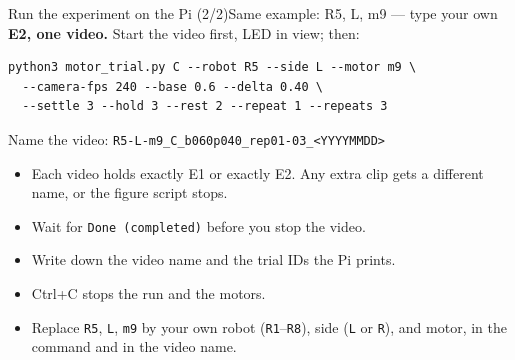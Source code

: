 %
\begin{frame}[fragile]{Run the experiment on the Pi (2/2)}{Same example: R5, L, m9 --- type your own}
  \label{app:pi-e2}
  \scriptsize
  \textbf{E2, one video.} Start the video first, LED in view; then:
\begin{verbatim}
python3 motor_trial.py C --robot R5 --side L --motor m9 \
  --camera-fps 240 --base 0.6 --delta 0.40 \
  --settle 3 --hold 3 --rest 2 --repeat 1 --repeats 3
\end{verbatim}
  \vspace{-4pt}
  Name the video: \texttt{R5-L-m9\_C\_b060p040\_rep01-03\_<YYYYMMDD>}

  \vspace{6pt}
  \begin{itemize}\setlength{\itemsep}{3pt}
    \item Each video holds \alert{exactly E1 or exactly E2}. Any extra clip gets a different name, or the figure script stops.
    \item Wait for \texttt{Done (completed)} before you stop the video.
    \item Write down the video name and the trial IDs the Pi prints.
    \item \alert{Ctrl+C} stops the run and the motors.
    \item Replace \texttt{R5}, \texttt{L}, \texttt{m9} by your own robot (\texttt{R1}--\texttt{R8}), side (\texttt{L} or \texttt{R}), and motor, in the command and in the video name.
  \end{itemize}
\end{frame}
